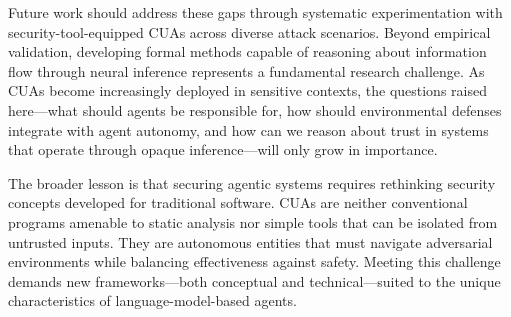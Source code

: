 Future work should address these gaps through systematic experimentation with security-tool-equipped CUAs across diverse attack scenarios. Beyond empirical validation, developing formal methods capable of reasoning about information flow through neural inference represents a fundamental research challenge. As CUAs become increasingly deployed in sensitive contexts, the questions raised here---what should agents be responsible for, how should environmental defenses integrate with agent autonomy, and how can we reason about trust in systems that operate through opaque inference---will only grow in importance.

The broader lesson is that securing agentic systems requires rethinking security concepts developed for traditional software. CUAs are neither conventional programs amenable to static analysis nor simple tools that can be isolated from untrusted inputs. They are autonomous entities that must navigate adversarial environments while balancing effectiveness against safety. Meeting this challenge demands new frameworks---both conceptual and technical---suited to the unique characteristics of language-model-based agents.

